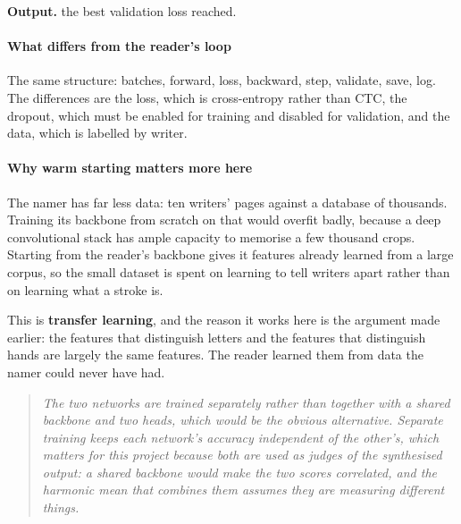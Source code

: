 \noindent\textbf{Output.} the best validation loss reached.


\paragraph{What differs from the reader's loop}
The same structure: batches, forward, loss, backward, step, validate, save, log. The differences are the loss, which is cross-entropy rather than CTC, the dropout, which must be enabled for training and disabled for validation, and the data, which is labelled by writer.


\paragraph{Why warm starting matters more here}
The namer has far less data: ten writers' pages against a database of thousands. Training its backbone from scratch on that would overfit badly, because a deep convolutional stack has ample capacity to memorise a few thousand crops. Starting from the reader's backbone gives it features already learned from a large corpus, so the small dataset is spent on learning to tell writers apart rather than on learning what a stroke is.

This is \textbf{transfer learning}, and the reason it works here is the argument made earlier: the features that distinguish letters and the features that distinguish hands are largely the same features. The reader learned them from data the namer could never have had.


\begin{quote}\small\itshape The two networks are trained separately rather than together with a shared backbone and two heads, which would be the obvious alternative. Separate training keeps each network's accuracy independent of the other's, which matters for this project because both are used as judges of the synthesised output: a shared backbone would make the two scores correlated, and the harmonic mean that combines them assumes they are measuring different things.\end{quote}
